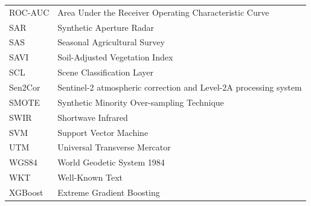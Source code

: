 \begin{longtable}{@{}p{3cm}p{10cm}@{}}
ROC-AUC & Area Under the Receiver Operating Characteristic Curve \\
SAR & Synthetic Aperture Radar \\
SAS & Seasonal Agricultural Survey \\
SAVI & Soil-Adjusted Vegetation Index \\
SCL & Scene Classification Layer \\
Sen2Cor & Sentinel-2 atmospheric correction and Level-2A processing system \\
SMOTE & Synthetic Minority Over-sampling Technique \\
SWIR & Shortwave Infrared \\
SVM & Support Vector Machine \\
UTM & Universal Transverse Mercator \\
WGS84 & World Geodetic System 1984 \\
WKT & Well-Known Text \\
XGBoost & Extreme Gradient Boosting \\

\end{longtable}
